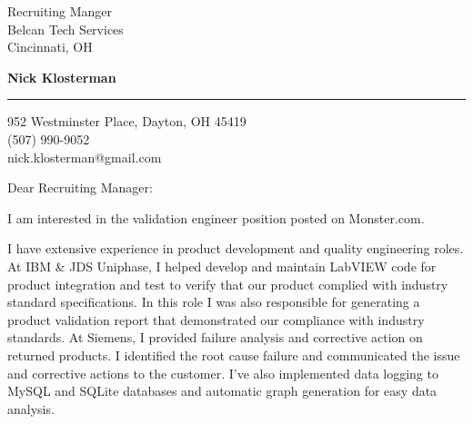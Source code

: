 \documentclass{letter} %
\newcommand{\person}{Recruiting Manager}
\newcommand{\position}{validation engineer }%
\begin{document}
\signature{Nick Klosterman}           %
\longindentation=0pt                       %
\let\raggedleft\raggedright                %
 

 
\begin{letter}{Recruiting Manger \\
Belcan Tech Services \\
Cincinnati, OH

}

  \begin{flushright}
 \hfill   \large\bf Nick Klosterman  \\
\end{flushright}
\begin{flushright}
    \medskip\hrule height 1pt
    \hfill 952 Westminster Place, Dayton, OH 45419 \\
    \hfill (507) 990-9052 \\
    \hfill nick.klosterman@gmail.com
  \end{flushright} 
\vfill %

 
\opening{Dear \person :} 

\noindent 
I am interested in the \position position posted on Monster.com. 

\noindent
I have extensive experience in product development and quality engineering roles. 
At IBM \& JDS Uniphase, I helped develop and maintain LabVIEW code for product integration and test to verify that our product complied with industry standard specifications.
In this role I was also responsible for generating a product validation report that demonstrated our compliance with industry standards.
At Siemens, I provided failure analysis and corrective action on returned products. 
I identified the root cause failure and communicated the issue and corrective actions to the customer.
I've also implemented data logging to MySQL and SQLite databases and automatic graph generation for easy data analysis.


\end{letter}
\end{document}
